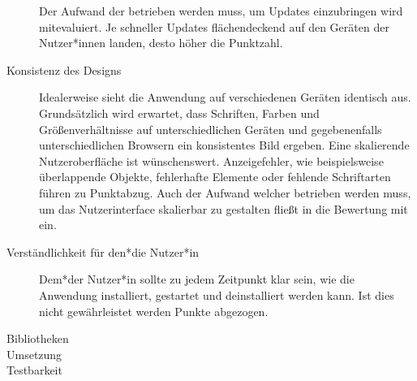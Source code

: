 \begin{description}
		Der Aufwand der betrieben werden muss, um Updates einzubringen wird mitevaluiert. Je schneller Updates flächendeckend auf den Geräten der Nutzer*innen landen, desto höher die Punktzahl.

    \item [Konsistenz des Designs]
    	Idealerweise sieht die Anwendung auf verschiedenen Geräten identisch aus. Grundsätzlich wird erwartet, dass Schriften, Farben und Größenverhältnisse auf unterschiedlichen Geräten und gegebenenfalls unterschiedlichen Browsern ein konsistentes Bild ergeben.
    	Eine skalierende Nutzeroberfläche ist wünschenswert. Anzeigefehler, wie beispielsweise überlappende Objekte, fehlerhafte Elemente oder fehlende Schriftarten führen zu Punktabzug. Auch der Aufwand welcher betrieben werden muss, um das Nutzerinterface skalierbar zu gestalten fließt in die Bewertung mit ein.
    	
    \item[Verständlichkeit für den*die Nutzer*in] Dem*der Nutzer*in sollte zu jedem Zeitpunkt klar sein, wie die Anwendung installiert, gestartet und deinstalliert werden kann. Ist dies nicht gewährleistet werden Punkte abgezogen.
    
    \item[Bibliotheken]    
    	
    \item[Umsetzung]          	
    	
    \item[Testbarkeit]  
\end{description}


